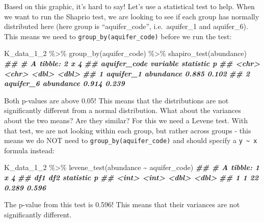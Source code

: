 \documentclass[
]{krantz}
\newenvironment{Shaded}{\begin{snugshade}}{\end{snugshade}}
\newcommand{\DocumentationTok}[1]{\textcolor[rgb]{0.56,0.35,0.01}{\textbf{\textit{#1}}}}
\newcommand{\FunctionTok}[1]{\textcolor[rgb]{0.00,0.00,0.00}{#1}}
\newcommand{\NormalTok}[1]{#1}
\newcommand{\SpecialCharTok}[1]{\textcolor[rgb]{0.00,0.00,0.00}{#1}}
\begin{document}
Based on this graphic, it's hard to say! Let's use a statistical test to help. When we want to run the Shaprio test, we are looking to see if each group has normally distributed here (here group is ``aquifer\_code'', i.e.~aquifer\_1 and aquifer\_6). This means we need to \texttt{group\_by(aquifer\_code)} before we run the test:

\begin{Shaded}
\begin{Highlighting}[]
\NormalTok{K\_data\_1\_2 }\SpecialCharTok{\%\textgreater{}\%}
  \FunctionTok{group\_by}\NormalTok{(aquifer\_code) }\SpecialCharTok{\%\textgreater{}\%} 
  \FunctionTok{shapiro\_test}\NormalTok{(abundance)}
\DocumentationTok{\#\# \# A tibble: 2 x 4}
\DocumentationTok{\#\#   aquifer\_code variable  statistic     p}
\DocumentationTok{\#\#   \textless{}chr\textgreater{}        \textless{}chr\textgreater{}         \textless{}dbl\textgreater{} \textless{}dbl\textgreater{}}
\DocumentationTok{\#\# 1 aquifer\_1    abundance     0.885 0.102}
\DocumentationTok{\#\# 2 aquifer\_6    abundance     0.914 0.239}
\end{Highlighting}
\end{Shaded}

Both p-values are above 0.05! This means that the distributions are not significantly different from a normal distribution. What about the variances about the two means? Are they similar? For this we need a Levene test. With that test, we are not looking within each group, but rather across groups - this means we do NOT need to \texttt{group\_by(aquifer\_code)} and should specify a \texttt{y\ \textasciitilde{}\ x} formula instead:

\begin{Shaded}
\begin{Highlighting}[]
\NormalTok{K\_data\_1\_2 }\SpecialCharTok{\%\textgreater{}\%}
  \FunctionTok{levene\_test}\NormalTok{(abundance }\SpecialCharTok{\textasciitilde{}}\NormalTok{ aquifer\_code)}
\DocumentationTok{\#\# \# A tibble: 1 x 4}
\DocumentationTok{\#\#     df1   df2 statistic     p}
\DocumentationTok{\#\#   \textless{}int\textgreater{} \textless{}int\textgreater{}     \textless{}dbl\textgreater{} \textless{}dbl\textgreater{}}
\DocumentationTok{\#\# 1     1    22     0.289 0.596}
\end{Highlighting}
\end{Shaded}

The p-value from this test is 0.596! This means that their variances are not significantly different.
\end{document}
